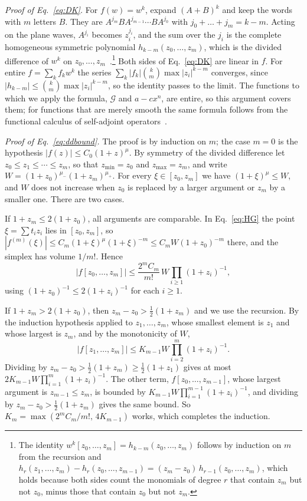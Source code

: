 \documentclass[aps,prd,10pt,twocolumn,superscriptaddress,nofootinbib,floatfix,longbibliography]{revtex4-2}
\begin{document}
\textit{Proof of Eq.~\eqref{eq:DK}.} For $f(w)=w^k$, expand $(A+B)^k$ and keep the words with $m$ letters $B$. They are $A^{j_m}BA^{j_{m-1}}\cdots BA^{j_0}$ with $j_0+\dots+j_m=k-m$. Acting on the plane waves, $A^{j_i}$ becomes $z_i^{j_i}$, and the sum over the $j_i$ is the complete homogeneous symmetric polynomial $h_{k-m}(z_0,\dots,z_m)$, which is the divided difference of $w^k$ on $z_0,\dots,z_m$~\cite{deBoor2005}.\footnote{The identity $w^k[z_0,\dots,z_m]=h_{k-m}(z_0,\dots,z_m)$ follows by induction on $m$ from the recursion and $h_r(z_1,\dots,z_m)-h_r(z_0,\dots,z_{m-1})=(z_m-z_0)\,h_{r-1}(z_0,\dots,z_m)$, which holds because both sides count the monomials of degree $r$ that contain $z_m$ but not $z_0$, minus those that contain $z_0$ but not $z_m$.} Both sides of Eq.~\eqref{eq:DK} are linear in $f$. For entire $f=\sum_kf_kw^k$ the series $\sum_k|f_k|\binom km\max|z_i|^{k-m}$ converges, since $|h_{k-m}|\le\binom km\max|z_i|^{k-m}$, so the identity passes to the limit. The functions to which we apply the formula, $\mathcal G$ and $a-cx^n$, are entire, so this argument covers them; for functions that are merely smooth the same formula follows from the functional calculus of self-adjoint operators~\cite{DaletskiiKrein1965}.

\textit{Proof of Eq.~\eqref{eq:ddbound}.} The proof is by induction on $m$; the case $m=0$ is the hypothesis $|f(z)|\le C_0(1+z)^\mu$. By symmetry of the divided difference let $z_0\le z_1\le\cdots\le z_m$, so that $z_{\min}=z_0$ and $z_{\max}=z_m$, and write $W=(1+z_0)^{\mu_-}(1+z_m)^{\mu_+}$. For every $\xi\in[z_0,z_m]$ we have $(1+\xi)^{\mu}\le W$, and $W$ does not increase when $z_0$ is replaced by a larger argument or $z_m$ by a smaller one. There are two cases.

If $1+z_m\le2(1+z_0)$, all arguments are comparable. In Eq.~\eqref{eq:HG} the point $\xi=\sum t_iz_i$ lies in $[z_0,z_m]$, so $|f^{(m)}(\xi)|\le C_m(1+\xi)^{\mu}(1+\xi)^{-m}\le C_mW(1+z_0)^{-m}$ there, and the simplex has volume $1/m!$. Hence
\[
|f[z_0,\dots,z_m]|\le\frac{2^mC_m}{m!}\,W\prod_{i\ge1}(1+z_i)^{-1},
\]
using $(1+z_0)^{-1}\le2(1+z_i)^{-1}$ for each $i\ge1$.

If $1+z_m>2(1+z_0)$, then $z_m-z_0>\frac12(1+z_m)$ and we use the recursion. By the induction hypothesis applied to $z_1,\dots,z_m$, whose smallest element is $z_1$ and whose largest is $z_m$, and by the monotonicity of $W$,
\[
|f[z_1,\dots,z_m]|\le K_{m-1}W\prod_{i=2}^m(1+z_i)^{-1}.
\]
Dividing by $z_m-z_0>\frac12(1+z_m)\ge\frac12(1+z_1)$ gives at most $2K_{m-1}W\prod_{i=1}^m(1+z_i)^{-1}$. The other term, $f[z_0,\dots,z_{m-1}]$, whose largest argument is $z_{m-1}\le z_m$, is bounded by $K_{m-1}W\prod_{i=1}^{m-1}(1+z_i)^{-1}$, and dividing by $z_m-z_0>\frac12(1+z_m)$ gives the same bound. So $K_m=\max(2^mC_m/m!,\,4K_{m-1})$ works, which completes the induction.
\end{document}
